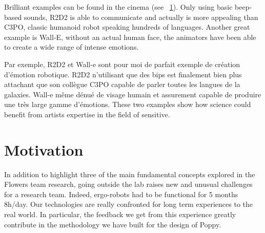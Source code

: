 Brilliant examples can be found in the cinema (see \figurename~\ref{fig:robot_emotion_cinema}). Only using basic beep-based sounds, R2D2 is able to communicate and actually is more appealing than C3PO, classic humanoid robot speaking hundreds of languages. Another great example is Wall-E, without an actual human face, the animators have been able to create a wide range of intense emotions.


\begin{figure}[t]
\centering
    \hfil
    \caption{}
    \label{fig:robot_emotion_cinema}
\end{figure}

Par exemple, R2D2 et Wall-e sont pour moi de parfait exemple de création d'émotion robotique. R2D2 n'utilisant que des bips est finalement bien plus attachant que son collègue C3PO capable de parler toutes les langues de la galaxies. Wall-e même dénué de visage humain et assurement capable de produire une très large gamme d'émotions.
These two examples show how science could benefit from artists expertise in the field of sensitive.








\section{Motivation } %
\label{sec:motivation_}

In addition to highlight three of the main fundamental concepts explored in the Flowers team research, going outside the lab raises new and unusual challenges for a research team. Indeed, ergo-robots had to be functional for 5 months 8h/day. Our technologies are really confronted for long term experiences to the real world. In particular, the feedback we get from this experience greatly contribute in the methodology we have built for the design of Poppy.


